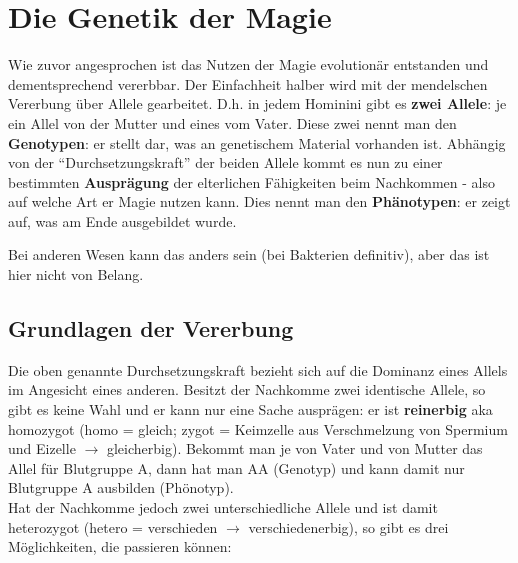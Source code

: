 \section{Die Genetik der Magie}
Wie zuvor angesprochen ist das Nutzen der Magie evolutionär entstanden und dementsprechend vererbbar.
Der Einfachheit halber wird mit der mendelschen Vererbung über Allele gearbeitet.
D.h. in jedem Hominini gibt es \textbf{zwei Allele}: je ein Allel von der Mutter und eines vom Vater.
Diese zwei nennt man den \textbf{Genotypen}: er stellt dar, was an genetischem Material vorhanden ist.
Abhängig von der "`Durchsetzungskraft"' der beiden Allele kommt es nun zu einer bestimmten \textbf{Ausprägung} der elterlichen Fähigkeiten beim Nachkommen - also auf welche Art er Magie nutzen kann.
Dies nennt man den \textbf{Phänotypen}: er zeigt auf, was am Ende ausgebildet wurde.

Bei anderen Wesen kann das anders sein (bei Bakterien definitiv), aber das ist hier nicht von Belang.


\subsection{Grundlagen der Vererbung}
Die oben genannte Durchsetzungskraft bezieht sich auf die Dominanz eines Allels im Angesicht eines anderen. 
Besitzt der Nachkomme zwei identische Allele, so gibt es keine Wahl und er kann nur eine Sache ausprägen: 
er ist \textbf{reinerbig} aka homozygot (homo = gleich; zygot = Keimzelle aus Verschmelzung von Spermium und Eizelle $\rightarrow$ gleicherbig).
Bekommt man \zB je von Vater und von Mutter das Allel für Blutgruppe A, dann hat man AA (Genotyp) und kann damit nur Blutgruppe A ausbilden (Phönotyp). \\
Hat der Nachkomme jedoch zwei unterschiedliche Allele und ist damit heterozygot (hetero = verschieden $\rightarrow$ verschiedenerbig), so gibt es drei Möglichkeiten, die passieren können:

